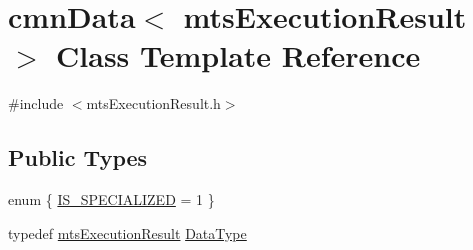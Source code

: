 \hypertarget{classcmn_data_3_01mts_execution_result_01_4}{\section{cmn\-Data$<$ mts\-Execution\-Result $>$ Class Template Reference}
\label{classcmn_data_3_01mts_execution_result_01_4}
}


{\ttfamily \#include $<$mts\-Execution\-Result.\-h$>$}

\subsection*{Public Types}
\begin{DoxyCompactItemize}
\item 
enum \{ \hyperlink{classcmn_data_3_01mts_execution_result_01_4_a61233bb730e9193a816e39e51444dd34a0113b7ee2fabebada4b23fb00857680a}{I\-S\-\_\-\-S\-P\-E\-C\-I\-A\-L\-I\-Z\-E\-D} = 1
 \}
\item 
typedef \hyperlink{classmts_execution_result}{mts\-Execution\-Result} \hyperlink{classcmn_data_3_01mts_execution_result_01_4_ac2ad50be3b07e7b046435ae0ed516b18}{Data\-Type}
\end{DoxyCompactItemize}
